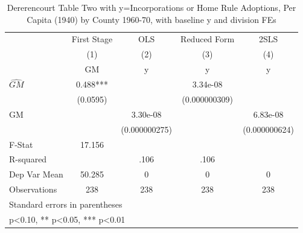 \begin{table}[htbp]\centering
\def\sym#1{\ifmmode^{#1}\else\(^{#1}\)\fi}
\caption{Dererencourt Table Two with y=Incorporations or Home Rule Adoptions, Per Capita (1940) by County 1960-70, with baseline y and division FEs}
\begin{tabular}{l*{4}{c}}
\toprule
                    & First Stage   &         OLS   &Reduced Form   &        2SLS   \\
                    &\multicolumn{1}{c}{(1)}&\multicolumn{1}{c}{(2)}&\multicolumn{1}{c}{(3)}&\multicolumn{1}{c}{(4)}\\
                    &\multicolumn{1}{c}{GM}&\multicolumn{1}{c}{y}&\multicolumn{1}{c}{y}&\multicolumn{1}{c}{y}\\
\midrule
$\hat{GM}$          &       0.488***&               &    3.34e-08   &               \\
                    &    (0.0595)   &               &(0.000000309)   &               \\
\addlinespace
GM                  &               &    3.30e-08   &               &    6.83e-08   \\
                    &               &(0.000000275)   &               &(0.000000624)   \\
\midrule
F-Stat              &      17.156   &               &               &               \\
R-squared           &               &        .106   &        .106   &               \\
Dep Var Mean        &      50.285   &           0   &           0   &           0   \\
Observations        &         238   &         238   &         238   &         238   \\
\bottomrule
\multicolumn{5}{l}{\footnotesize Standard errors in parentheses}\\
\multicolumn{5}{l}{\footnotesize * p<0.10, ** p<0.05, *** p<0.01}\\
\end{tabular}
\end{table}
